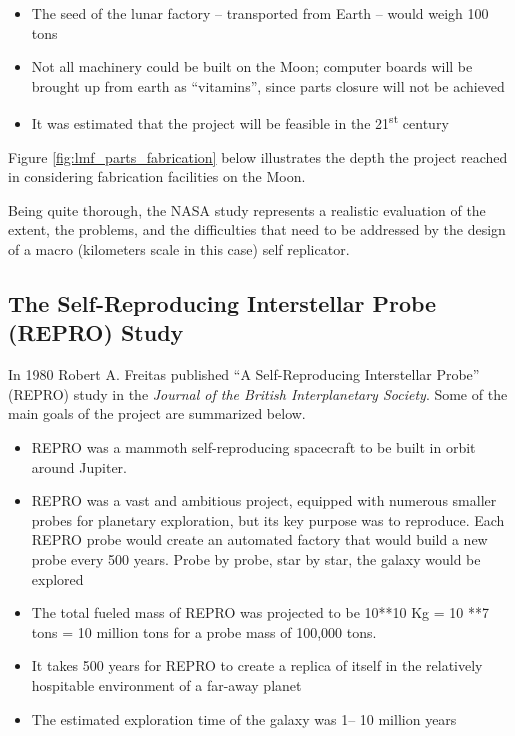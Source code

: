 \begin{itemize}
\item The seed of the lunar factory – transported from Earth – would
weigh 100 tons
\item Not all machinery could be built on the Moon; computer boards will
be brought up from earth as “vitamins”, since parts closure will not be
achieved
\item It was estimated that the project will be feasible in the
21\textsuperscript{st} century
\end{itemize}

Figure \ref{fig:lmf_parts_fabrication} below illustrates the depth the project reached in considering
fabrication facilities on the Moon.


Being quite thorough, the NASA study represents a realistic evaluation of
the extent, the problems, and the difficulties that need to be addressed
by the design of a macro (kilometers scale in this case) self
replicator.

\subsection[The Self{}-Reproducing Interstellar Probe (REPRO) Study]{The
Self-Reproducing Interstellar Probe (REPRO) Study}

In 1980 Robert A. Freitas
published  “A Self-Reproducing Interstellar Probe” (REPRO) study  in
the \textit{Journal of the British Interplanetary Society}. Some of the
main goals of the project are summarized below.

\begin{itemize}
\item REPRO was a mammoth self-reproducing spacecraft to be built in
orbit around Jupiter.
\item REPRO was a vast and ambitious project, equipped with numerous
smaller probes for planetary exploration, but its key purpose was to
reproduce. Each REPRO probe would create an automated factory that
would build a new probe every 500 years. Probe by probe, star by star,
the galaxy would be explored 
\item The total fueled mass of REPRO was projected to be 10**10 Kg = 10
**7 tons = 10 million tons for a probe mass of 100,000 tons.
\item It takes 500 years for REPRO to create a replica of itself in the
relatively hospitable environment of a far-away planet
\item The estimated exploration time of the galaxy was 1– 10 million
years
\end{itemize}

